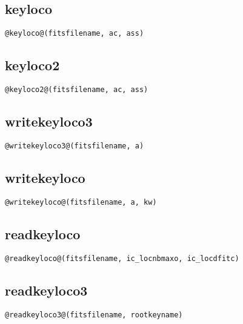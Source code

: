 \vspace{0.5cm}
\subsection{keyloco}
\begin{lstlisting}[style=pythonstyle]
@keyloco@(fitsfilename, ac, ass)
\end{lstlisting}

\vspace{0.5cm}
\subsection{keyloco2}
\begin{lstlisting}[style=pythonstyle]
@keyloco2@(fitsfilename, ac, ass)
\end{lstlisting}

\vspace{0.5cm}
\subsection{writekeyloco3}
\begin{lstlisting}[style=pythonstyle]
@writekeyloco3@(fitsfilename, a)
\end{lstlisting}

\vspace{0.5cm}
\subsection{writekeyloco}
\begin{lstlisting}[style=pythonstyle]
@writekeyloco@(fitsfilename, a, kw)
\end{lstlisting}

\vspace{0.5cm}
\subsection{readkeyloco}
\begin{lstlisting}[style=pythonstyle]
@readkeyloco@(fitsfilename, ic_locnbmaxo, ic_locdfitc)
\end{lstlisting}

\vspace{0.5cm}
\subsection{readkeyloco3}
\begin{lstlisting}[style=pythonstyle]
@readkeyloco3@(fitsfilename, rootkeyname)
\end{lstlisting}


